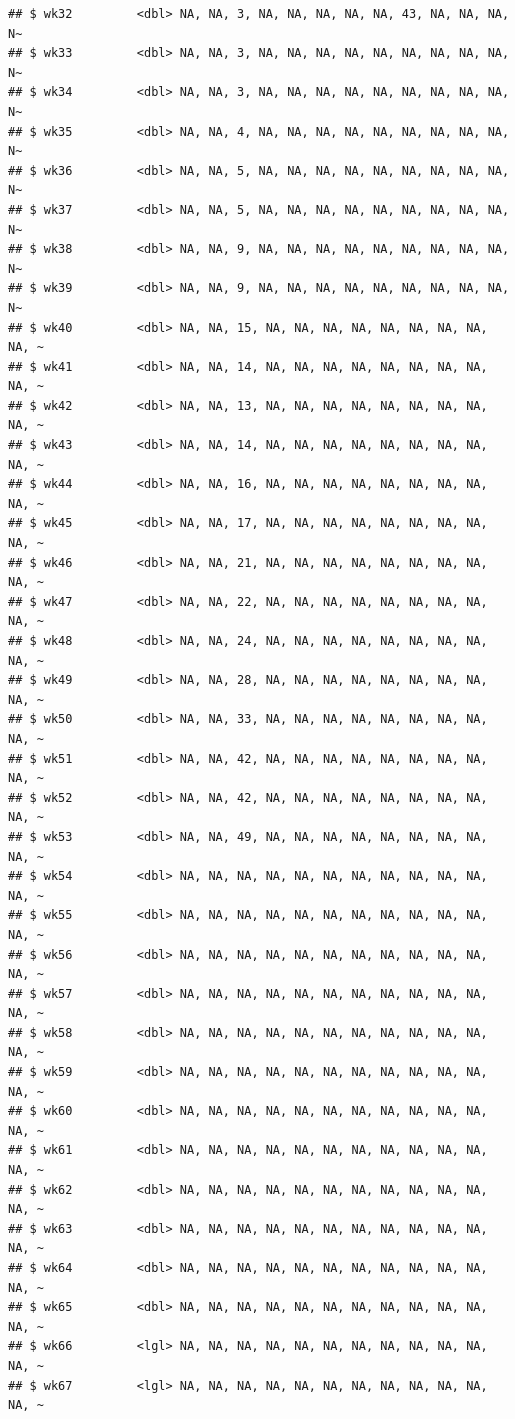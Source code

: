 \documentclass[
  11pt]{report}
\begin{document}
\begin{itemize}
\begin{verbatim}
## $ wk32         <dbl> NA, NA, 3, NA, NA, NA, NA, NA, 43, NA, NA, NA, N~
## $ wk33         <dbl> NA, NA, 3, NA, NA, NA, NA, NA, NA, NA, NA, NA, N~
## $ wk34         <dbl> NA, NA, 3, NA, NA, NA, NA, NA, NA, NA, NA, NA, N~
## $ wk35         <dbl> NA, NA, 4, NA, NA, NA, NA, NA, NA, NA, NA, NA, N~
## $ wk36         <dbl> NA, NA, 5, NA, NA, NA, NA, NA, NA, NA, NA, NA, N~
## $ wk37         <dbl> NA, NA, 5, NA, NA, NA, NA, NA, NA, NA, NA, NA, N~
## $ wk38         <dbl> NA, NA, 9, NA, NA, NA, NA, NA, NA, NA, NA, NA, N~
## $ wk39         <dbl> NA, NA, 9, NA, NA, NA, NA, NA, NA, NA, NA, NA, N~
## $ wk40         <dbl> NA, NA, 15, NA, NA, NA, NA, NA, NA, NA, NA, NA, ~
## $ wk41         <dbl> NA, NA, 14, NA, NA, NA, NA, NA, NA, NA, NA, NA, ~
## $ wk42         <dbl> NA, NA, 13, NA, NA, NA, NA, NA, NA, NA, NA, NA, ~
## $ wk43         <dbl> NA, NA, 14, NA, NA, NA, NA, NA, NA, NA, NA, NA, ~
## $ wk44         <dbl> NA, NA, 16, NA, NA, NA, NA, NA, NA, NA, NA, NA, ~
## $ wk45         <dbl> NA, NA, 17, NA, NA, NA, NA, NA, NA, NA, NA, NA, ~
## $ wk46         <dbl> NA, NA, 21, NA, NA, NA, NA, NA, NA, NA, NA, NA, ~
## $ wk47         <dbl> NA, NA, 22, NA, NA, NA, NA, NA, NA, NA, NA, NA, ~
## $ wk48         <dbl> NA, NA, 24, NA, NA, NA, NA, NA, NA, NA, NA, NA, ~
## $ wk49         <dbl> NA, NA, 28, NA, NA, NA, NA, NA, NA, NA, NA, NA, ~
## $ wk50         <dbl> NA, NA, 33, NA, NA, NA, NA, NA, NA, NA, NA, NA, ~
## $ wk51         <dbl> NA, NA, 42, NA, NA, NA, NA, NA, NA, NA, NA, NA, ~
## $ wk52         <dbl> NA, NA, 42, NA, NA, NA, NA, NA, NA, NA, NA, NA, ~
## $ wk53         <dbl> NA, NA, 49, NA, NA, NA, NA, NA, NA, NA, NA, NA, ~
## $ wk54         <dbl> NA, NA, NA, NA, NA, NA, NA, NA, NA, NA, NA, NA, ~
## $ wk55         <dbl> NA, NA, NA, NA, NA, NA, NA, NA, NA, NA, NA, NA, ~
## $ wk56         <dbl> NA, NA, NA, NA, NA, NA, NA, NA, NA, NA, NA, NA, ~
## $ wk57         <dbl> NA, NA, NA, NA, NA, NA, NA, NA, NA, NA, NA, NA, ~
## $ wk58         <dbl> NA, NA, NA, NA, NA, NA, NA, NA, NA, NA, NA, NA, ~
## $ wk59         <dbl> NA, NA, NA, NA, NA, NA, NA, NA, NA, NA, NA, NA, ~
## $ wk60         <dbl> NA, NA, NA, NA, NA, NA, NA, NA, NA, NA, NA, NA, ~
## $ wk61         <dbl> NA, NA, NA, NA, NA, NA, NA, NA, NA, NA, NA, NA, ~
## $ wk62         <dbl> NA, NA, NA, NA, NA, NA, NA, NA, NA, NA, NA, NA, ~
## $ wk63         <dbl> NA, NA, NA, NA, NA, NA, NA, NA, NA, NA, NA, NA, ~
## $ wk64         <dbl> NA, NA, NA, NA, NA, NA, NA, NA, NA, NA, NA, NA, ~
## $ wk65         <dbl> NA, NA, NA, NA, NA, NA, NA, NA, NA, NA, NA, NA, ~
## $ wk66         <lgl> NA, NA, NA, NA, NA, NA, NA, NA, NA, NA, NA, NA, ~
## $ wk67         <lgl> NA, NA, NA, NA, NA, NA, NA, NA, NA, NA, NA, NA, ~

\end{verbatim}
\end{itemize}
\end{document}

